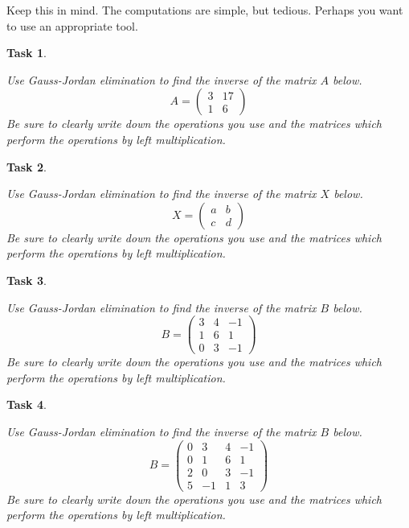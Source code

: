 \documentclass[10pt,]{book}
\theoremstyle{plain}
\numberwithin{equation}{section}
\newtheorem{task}{Task}[chapter]
\begin{document}
      Keep this in mind. The computations are simple, but tedious.
      Perhaps you want to use an appropriate tool.
\begin{task}
\label{task-62}

        Use Gauss-Jordan elimination to find the inverse of the matrix \(A\) below.
        \[
        A = \begin{pmatrix} 3 & 17 \\ 1 & 6 \end{pmatrix}
        \]
        Be sure to clearly write down the operations you use and the matrices
        which perform the operations by left multiplication.
      \end{task}
\begin{task}
\label{task-63}

        Use Gauss-Jordan elimination to find the inverse of the matrix \(X\) below.
        \[
        X = \begin{pmatrix} a & b \\ c & d \end{pmatrix}
        \]
        Be sure to clearly write down the operations you use and the matrices
        which perform the operations by left multiplication.
      \end{task}
\begin{task}
\label{task-64}

        Use Gauss-Jordan elimination to find the inverse of the matrix \(B\) below.
        \[
        B = \begin{pmatrix} 3 & 4 & -1\\ 1 & 6 & 1 \\
        0 & 3 & -1 \end{pmatrix}
        \]
        Be sure to clearly write down the operations you use and the matrices
        which perform the operations by left multiplication.
      \end{task}
\begin{task}
\label{task-65}

        Use Gauss-Jordan elimination to find the inverse of the matrix \(B\) below.
        \[
        B = \begin{pmatrix}
        0 & 3 & 4 & -1\\
        0 & 1 & 6 & 1 \\
        2 & 0 & 3 & -1 \\
        5 & -1 & 1 & 3
        \end{pmatrix}
        \]
        Be sure to clearly write down the operations you use and the matrices
        which perform the operations by left multiplication.
      \end{task}
\end{document}
